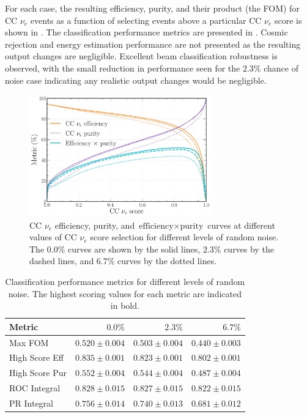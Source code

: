 For each case, the resulting efficiency, purity, and their product (the FOM) for CC $\nu_{e}$
events as a function of selecting events above a particular CC $\nu_{e}$ score is shown in
. The classification performance metrics are presented
in . Cosmic rejection and energy estimation performance are not
presented as the resulting output changes are negligible. Excellent beam classification robustness
is observed, with the small reduction in performance seen for the $2.3\%$ chance of noise case
indicating any realistic output changes would be negligible.

\begin{figure} %
    \includegraphics[width=0.7\textwidth]{diagrams/7-results/calib_noise_nuel_eff_curves.pdf}
    \caption[CC $\nu_{e}$ efficiency and purity curves for different levels of random noise]
    {CC $\nu_{e}$ efficiency, purity, and $\text{efficiency}\times\text{purity}$ curves at
        different values of CC $\nu_{e}$ score selection for different levels of random noise. The
        $0.0\%$ curves are shown by the solid lines, $2.3\%$ curves by the dashed lines, and
        $6.7\%$ curves by the dotted lines.}
    \label{fig:calib_noise_nuel_eff_curves}
\end{figure}

\begin{table} %
    \begin{tabular}{lrrr}
        Metric         & $0.0\%$        & $2.3\%$ & $6.7\%$ \\
        \midrule
        Max FOM        & \textbf{$0.520\pm0.004$} & $0.503\pm0.004$ & $0.440\pm0.003$ \\
        High Score Eff & \textbf{$0.835\pm0.001$} & $0.823\pm0.001$ & $0.802\pm0.001$ \\
        High Score Pur & \textbf{$0.552\pm0.004$} & $0.544\pm0.004$ & $0.487\pm0.004$ \\
        ROC Integral   & \textbf{$0.828\pm0.015$} & $0.827\pm0.015$ & $0.822\pm0.015$ \\
        PR Integral    & \textbf{$0.756\pm0.014$} & $0.740\pm0.013$ & $0.681\pm0.012$ \\
    \end{tabular}
    \caption[Classification performance metrics for different levels of random noise]
    {Classification performance metrics for different levels of random noise. The highest scoring
        values for each metric are indicated in bold.}
    \label{tab:calib_noise}
\end{table}

